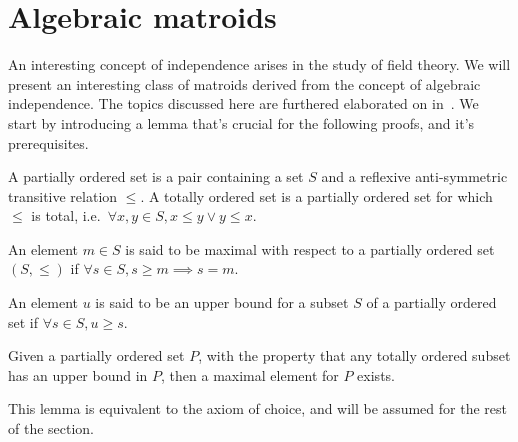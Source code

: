 \section{Algebraic matroids}

An interesting concept of independence arises in the study of field theory. We will present an interesting class of matroids derived from the concept of algebraic independence. The topics discussed here are furthered elaborated on in~\cite{milne2022}. We start by introducing a lemma that's crucial for the following proofs, and it's prerequisites.

\begin{defn}
    A partially ordered set is a pair containing a set $S$ and a reflexive anti-symmetric transitive relation $\leq$. A totally ordered set is a partially ordered set for which $\leq$ is total, i.e.\ $\forall x, y \in S, x \leq y \lor y \leq x$.
\end{defn}

\begin{defn}
    An element $m \in S$ is said to be maximal with respect to a partially ordered set $(S, \leq)$ if $\forall s \in S, s \geq m \implies s = m$.
\end{defn}

\begin{defn}
    An element $u$ is said to be an upper bound for a subset $S$ of a partially ordered set if $\forall s \in S, u \geq s$.
\end{defn}

\begin{lemma}[Zorn]\label{lem:Zorn}
   Given a partially ordered set $P$, with the property that any totally ordered subset has an upper bound in $P$, then a maximal element for $P$ exists.
\end{lemma}

This lemma is equivalent to the axiom of choice, and will be assumed for the rest of the section.
